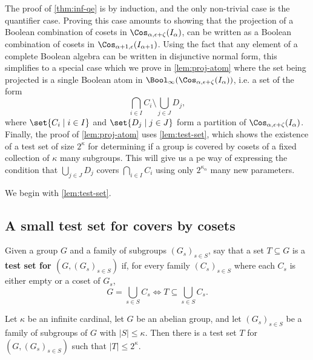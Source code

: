 \documentclass[11pt]{article}
\begin{document}
The proof of \cref{thm:inf-qe} is by induction, and the only non-trivial case is the quantifier case.
Proving this case amounts to showing that the projection of a Boolean combination of cosets in $\Cos_{\alpha,\epsilon+\zeta}(I_\alpha)$, can be written as a Boolean combination of cosets in $\Cos_{\alpha+1,\epsilon}(I_{\alpha+1})$.
Using the fact that any element of a complete Boolean algebra can be written in disjunctive normal form, this simplifies to a special case which we prove in \cref{lem:proj-atom} where the set being projected is a single Boolean atom in $\Bool_\infty(\Cos_{\alpha,\epsilon+\zeta}(I_\alpha))$, i.e. a set of the form
\[ \bigcap_{i \in I} C_i \setminus \bigcup_{j \in J} D_j, \]
where $\set{C_i \mid i \in I}$ and $\set{D_j \mid j \in J}$ form a partition of $\Cos_{\alpha,\epsilon+\zeta}(I_\alpha)$.
Finally, the proof of \cref{lem:proj-atom} uses \cref{lem:test-set}, which shows the existence of a test set of size $2^\kappa$ for determining if a group is covered by cosets of a fixed collection of $\kappa$ many subgroups.
This will give us a pe way of expressing the condition that $\bigcup_{j \in J} D_j$ covers $\bigcap_{i \in I} C_i$ using only $2^{\kappa_\alpha}$ many new parameters. 

We begin with \cref{lem:test-set}.

\subsection{A small test set for covers by cosets}

\begin{definition}
    Given a group $G$ and a family of subgroups $(G_s)_{s \in S}$, say that a set $T \subseteq G$ is a \textbf{test set for $(G,(G_s)_{s \in S})$} if, for every family $(C_s)_{s \in S}$ where each $C_s$ is either empty or a coset of $G_s$,
    \[ 
        G = \bigcup_{s \in S} C_s \iff T \subseteq \bigcup_{s \in S} C_s.
    \]
\end{definition}

\begin{lemma}
\label{lem:test-set}
    Let $\kappa$ be an infinite cardinal, let $G$ be an abelian group, and let $(G_s)_{s \in S}$ be a family of subgroups of $G$ with $|S| \leq \kappa$. Then there is a test set $T$ for $(G, (G_s)_{s \in S})$ such that $|T| \leq 2^\kappa$.
\end{lemma}
\end{document}
